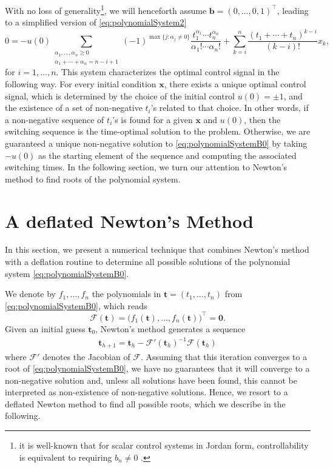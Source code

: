 \documentclass[11pt]{amsart}
\newcommand{\calF}{\mathcal{F}}
\theoremstyle{definition}
\theoremstyle{remark}
\numberwithin{equation}{section}
\begin{document}
With no loss of generality\footnote{it is well-known that for scalar control systems in Jordan form, controllability is equivalent to requiring $b_n\neq 0$ \cite{CD68}.}, we will henceforth assume $\bm{b} = (0, \dots, 0, 1)^\top$, leading to a simplified version of \eqref{eq:polynomialSystem2} 
\begin{equation}\label{eq:polynomialSystemB0}
0=-u(0)\sum_{\substack{\alpha_1,\ldots,\alpha_n\geq0\\
\alpha_1+\cdots+\alpha_n=n-i+1}}(-1)^{\max \{j\colon \alpha_j\neq0\}}\frac{t_1^{\alpha_1}\cdots t_n^{\alpha_n}}{\alpha_1!\cdots\alpha_n!}+{\sum_{k=i}^{n}\frac{(t_1+\cdots+t_n)^{k-i}}{(k-i)!}x_{k}},
\end{equation}
 for $i=1,\ldots,n$. This system characterizes the optimal control signal in the following way. For every initial condition $\bm{x}$, there exists a unique optimal control signal, which is determined by the choice of the initial control $u(0)=\pm 1$, and the existence of a set of non-negative $t_i$'s related to that choice. In other words, if a non-negative sequence of $t_i$'s is found for a given $\bm{x}$ and $u(0)$, then the switching sequence is the time-optimal solution to the problem. Otherwise, we are guaranteed a unique non-negative solution to \eqref{eq:polynomialSystemB0} by taking $-u(0)$ as the starting element of the sequence and computing the associated switching times. In the following section, we turn our attention to Newton's method to find roots of the polynomial system.

\section{A deflated Newton's Method}\label{newt}
 
In this section, we present a numerical technique that combines Newton's method with a deflation routine to determine all possible solutions of the polynomial system \eqref{eq:polynomialSystemB0}. 

We denote by $f_1,\dots,f_n$ the polynomials in $\bm t=(t_1,\dots, t_n)$ from \eqref{eq:polynomialSystemB0}, which reads
\begin{equation}\label{F}
\calF (\bm t)= \bigl(
 f_1 (\bm t),
 \dots,
 f_n (\bm t)\bigr)^\top=\bm{0}.
 \end{equation}
Given an initial guess $\bm{t}_0$, Newton's method generates a sequence 
\begin{align}\label{nsys}
\bm{t}_{h+1}=\bm{t}_{h}-\calF'(\bm{t}_{h})^{-1}\calF(\bm{t}_{h})
\end{align}
where $\mathcal{F}'$ denotes the Jacobian of $\mathcal{F}$. Assuming that this iteration converges to a root of \eqref{eq:polynomialSystemB0}, we have no guarantees that it will converge to a non-negative solution and, unless all solutions have been found, this cannot be interpreted as non-existence of non-negative solutions. Hence, we resort to a deflated Newton method to find all possible roots, which we describe in the following.
\end{document}
